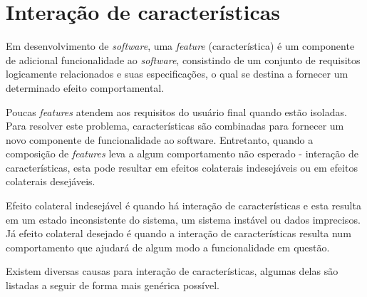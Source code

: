 \section{Interação de características}
\label{sec:featureinteraction}
Em desenvolvimento de \textit{software}, uma \textit{feature} (característica) é um componente de adicional funcionalidade ao \textit{software}\cite{Calder:2003}, consistindo de um conjunto de requisitos logicamente relacionados e suas especificações, o qual se destina a fornecer um determinado efeito comportamental\cite{NHLABATSI:2008}.

Poucas \textit{features} atendem aos requisitos do usuário final quando estão isoladas. Para resolver este problema, características são combinadas para fornecer um novo componente de funcionalidade ao software. Entretanto, quando a composição de \textit{features} leva a algum comportamento não esperado - interação de características, esta pode resultar em efeitos colaterais indesejáveis\cite{NHLABATSI:2008} ou em efeitos colaterais desejáveis\cite{Weiss:2005}.

Efeito colateral indesejável é quando há interação de características e esta resulta em um estado inconsistente do sistema, um sistema instável ou dados imprecisos. Já efeito colateral desejado é quando a interação de características resulta num comportamento que ajudará de algum modo a funcionalidade em questão.\cite{Weiss:2005}\cite{NHLABATSI:2008}

Existem diversas causas para interação de características, algumas delas são listadas a seguir de forma mais genérica possível.\cite{Weiss:2007}


